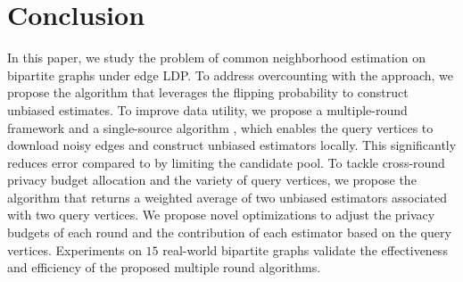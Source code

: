 \section{Conclusion}
\label{sec:conclusion}
In this paper, we study the problem of common neighborhood estimation on bipartite graphs under edge LDP. 
To address overcounting with the \naive approach, we propose the \bs algorithm that leverages the flipping probability to construct unbiased estimates. 
To improve data utility, we propose a multiple-round framework and a single-source algorithm \advss, which enables the query vertices to download noisy edges and construct unbiased estimators locally. 
This significantly reduces error compared to \bs by limiting the candidate pool. 
To tackle cross-round privacy budget allocation and the variety of query vertices, 
we propose the \advds algorithm that returns a weighted average of two unbiased estimators associated with two query vertices. 
We propose novel optimizations to adjust the privacy budgets of each round and the contribution of each estimator based on the query vertices. 
Experiments on $15$ real-world bipartite graphs validate the effectiveness and efficiency of the proposed multiple round algorithms. 